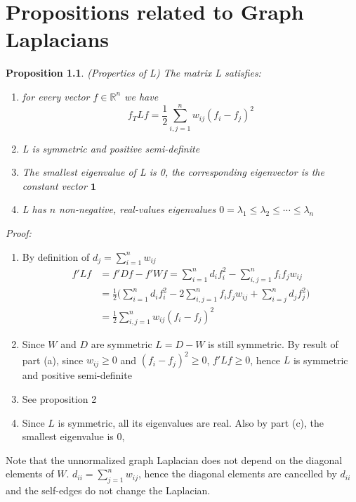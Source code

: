 \documentclass[10pt,a4paper, nocenter]{report}
\newtheorem{prop}{Proposition}
\begin{document}
    \chapter{Propositions related to Graph Laplacians}
    \begin{prop}(Properties of L) The matrix L satisfies:
        \begin{enumerate}
            \item for every vector $f \in \mathbb{R}^{n}$ we have $$ f_{T}Lf = \frac{1}{2}\sum_{i,j=1}^{n} w_{ij}(f_{i}-f_{j})^{2} $$
            \item L is symmetric and positive semi-definite
            \item The smallest eigenvalue of L is 0, the corresponding eigenvector is the constant vector $\mathbf{1}$
            \item L has $n$ non-negative, real-values eigenvalues $0=\lambda_{1} \le \lambda_{2} \le \cdots \le \lambda_{n}$
        \end{enumerate}
    \end{prop}
    \textit{Proof:}
    \begin{enumerate}
        \item  By definition of $d_{j} = \sum_{i=1}^{n}w_{ij}$
        \begin{align*}
        f'Lf & = f'Df - f'Wf = \sum_{i=1}^{n}d_{i}f_{i}^{2} -  \sum_{i,j=1}^{n}f_{i}f_{j}w_{ij}\\
        & = \frac{1}{2}\bigg(\sum_{i=1}^{n}d_{i}f_{i}^{2} -  2\sum_{i,j=1}^{n}f_{i}f_{j}w_{ij} + \sum_{i=j}^{n}d_{j}f_{j}^{2}\bigg)\\
        & = \frac{1}{2}\sum_{i,j=1}^{n}w_{ij}(f_{i}-f_{j})^{2}
        \end{align*}
        \item Since $W$ and $D$ are symmetric $L = D-W$ is still symmetric. By result of part (a), since $w_{ij} \ge 0$ and $(f_{i}-f_{j})^{2} \ge 0$, $f'Lf \ge 0$, hence $L$ is symmetric and positive semi-definite
        \item See proposition 2
        \item Since $L$ is symmetric, all its eigenvalues are real. Also by part (c), the smallest eigenvalue is 0, 
    \end{enumerate}

    Note that the unnormalized graph Laplacian does not depend on the diagonal elements of $W$. $d_{ii} = \sum_{j=1}^{n}w_{ij}$, hence the diagonal elements are cancelled by $d_{ii}$ and the self-edges do not change the Laplacian. \\
    
\end{document}
